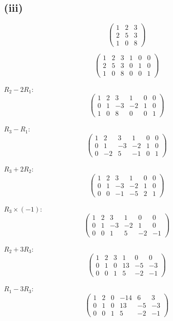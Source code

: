 \documentclass[12pt]{article}
\begin{document}
\subsection*{(iii)}
\[
	\begin{pmatrix}
		1 & 2 & 3 \\
		2 & 5 & 3 \\
		1 & 0 & 8
	\end{pmatrix}
\]

\[
	\begin{pmatrix}
		1 & 2 & 3 & 1 & 0 & 0 \\
		2 & 5 & 3 & 0 & 1 & 0 \\
		1 & 0 & 8 & 0 & 0 & 1
	\end{pmatrix}
\]

$R_2 - 2R_1$:
\[
	\begin{pmatrix}
		1 & 2  & 3  & 1  & 0 & 0 \\
		0 & 1  & -3 & -2 & 1 & 0 \\
		1 & 0 & 8 & 0 & 0 & 1
	\end{pmatrix}
\]

$R_3 - R_1$:
\[
	\begin{pmatrix}
		1 & 2  & 3  & 1  & 0 & 0 \\
		0 & 1  & -3 & -2 & 1 & 0 \\
		0 & -2 & 5  & -1 & 0 & 1
	\end{pmatrix}
\]

$R_3 + 2R_2$:
\[
	\begin{pmatrix}
		1 & 2 & 3  & 1  & 0 & 0 \\
		0 & 1 & -3 & -2 & 1 & 0 \\
		0 & 0 & -1 & -5 & 2 & 1
	\end{pmatrix}
\]

$R_3 \times (-1)$:
\[
	\begin{pmatrix}
		1 & 2 & 3  & 1  & 0  & 0  \\
		0 & 1 & -3 & -2 & 1  & 0  \\
		0 & 0 & 1  & 5  & -2 & -1
	\end{pmatrix}
\]

$R_2 + 3R_3$:
\[
	\begin{pmatrix}
		1 & 2 & 3 & 1 & 0  & 0  \\
		0 & 1 & 0 & 13  & -5 & -3 \\
		0 & 0 & 1  & 5  & -2 & -1
	\end{pmatrix}
\]

$R_1 - 3R_3$:
\[
	\begin{pmatrix}
		1 & 2 & 0 & -14 & 6  & 3  \\
		0 & 1 & 0 & 13  & -5 & -3 \\
		0 & 0 & 1 & 5   & -2 & -1
	\end{pmatrix}
\]
\end{document}
